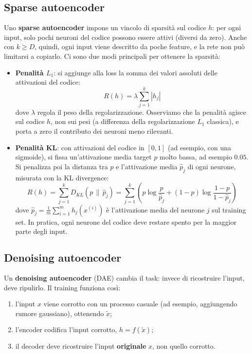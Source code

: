 \subsection{Sparse autoencoder}
Uno \textbf{sparse autoencoder} impone un vincolo di sparsità sul codice $h$: per ogni input, solo pochi neuroni del codice possono essere attivi (diversi da zero). Anche con $k \geq D$, quindi, ogni input viene descritto da poche feature, e la rete non può limitarsi a copiarlo. Ci sono due modi principali per ottenere la sparsità:
\begin{itemize}
    \item \textbf{Penalità $L_1$}: si aggiunge alla loss la somma dei valori assoluti delle attivazioni del codice:
    \[
        R(h) = \lambda \sum_{j=1}^{k} |h_j|
    \]
    dove $\lambda$ regola il peso della regolarizzazione. Osserviamo che la penalità agisce sul codice $h$, non sui pesi (a differenza della regolarizzazione $L_1$ classica), e porta a zero il contributo dei neuroni meno rilevanti.
    \item \textbf{Penalità KL}: con attivazioni del codice in $[0, 1]$ (ad esempio, con una sigmoide), si fissa un'attivazione media target $p$ molto bassa, ad esempio $0.05$. Si penalizza poi la distanza tra $p$ e l'attivazione media $\hat{p}_j$ di ogni neurone, misurata con la KL divergence:
    \[
        R(h) = \sum_{j=1}^{k} D_{KL}(p \,\|\, \hat{p}_j) = \sum_{j=1}^{k} \left( p \log\frac{p}{\hat{p}_j} + (1 - p) \log\frac{1 - p}{1 - \hat{p}_j} \right)
    \]
    dove $\hat{p}_j = \frac{1}{m}\sum_{i=1}^{m} h_j(x^{(i)})$ è l'attivazione media del neurone $j$ sul training set. In pratica, ogni neurone del codice deve restare spento per la maggior parte degli input.
\end{itemize}

\subsection{Denoising autoencoder}
Un \textbf{denoising autoencoder} (DAE) cambia il task: invece di ricostruire l'input, deve ripulirlo. Il training funziona così:
\begin{enumerate}
    \item l'input $x$ viene corrotto con un processo casuale (ad esempio, aggiungendo rumore gaussiano), ottenendo $\tilde{x}$;
    \item l'encoder codifica l'input corrotto, $h = f(\tilde{x})$;
    \item il decoder deve ricostruire l'input \textbf{originale} $x$, non quello corrotto.
\end{enumerate}

